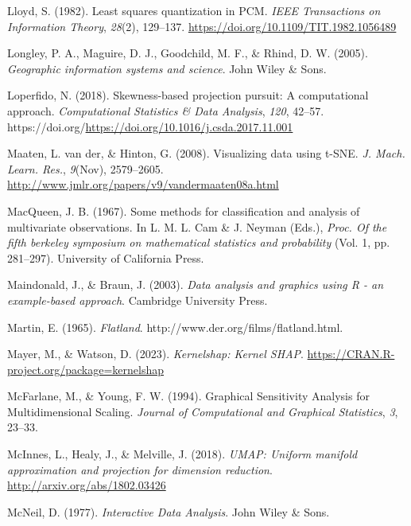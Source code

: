 \documentclass[
  letterpaper,
]{krantz}
\newlength{\cslhangindent}
\newenvironment{CSLReferences}[2] %
 {\begin{list}{}{%
  \setlength{\itemindent}{0pt}
  \setlength{\leftmargin}{0pt}
  \setlength{\parsep}{0pt}
  \ifodd #1
   \setlength{\leftmargin}{\cslhangindent}
   \setlength{\itemindent}{-1\cslhangindent}
  \fi
  \setlength{\itemsep}{#2\baselineskip}}}
 {\end{list}}
\begin{document}
\begin{CSLReferences}{1}{0}
Lloyd, S. (1982). Least squares quantization in PCM. \emph{IEEE
Transactions on Information Theory}, \emph{28}(2), 129--137.
\url{https://doi.org/10.1109/TIT.1982.1056489}

Longley, P. A., Maguire, D. J., Goodchild, M. F., \& Rhind, D. W.
(2005). \emph{Geographic information systems and science}. John Wiley \&
Sons.

Loperfido, N. (2018). Skewness-based projection pursuit: A computational
approach. \emph{Computational Statistics \& Data Analysis}, \emph{120},
42--57. https://doi.org/\url{https://doi.org/10.1016/j.csda.2017.11.001}

Maaten, L. van der, \& Hinton, G. (2008). Visualizing data using
{t-SNE}. \emph{J. Mach. Learn. Res.}, \emph{9}(Nov), 2579--2605.
\url{http://www.jmlr.org/papers/v9/vandermaaten08a.html}

MacQueen, J. B. (1967). Some methods for classification and analysis of
multivariate observations. In L. M. L. Cam \& J. Neyman (Eds.),
\emph{Proc. Of the fifth berkeley symposium on mathematical statistics
and probability} (Vol. 1, pp. 281--297). University of California Press.

Maindonald, J., \& Braun, J. (2003). \emph{Data analysis and graphics
using {R} - an example-based approach}. Cambridge University Press.

Martin, E. (1965). \emph{Flatland}.
http://www.der.org/films/flatland.html.

Mayer, M., \& Watson, D. (2023). \emph{Kernelshap: Kernel SHAP}.
\url{https://CRAN.R-project.org/package=kernelshap}

McFarlane, M., \& Young, F. W. (1994). Graphical {S}ensitivity
{A}nalysis for {M}ultidimensional {S}caling. \emph{Journal of
Computational and Graphical Statistics}, \emph{3}, 23--33.

McInnes, L., Healy, J., \& Melville, J. (2018). \emph{{UMAP}: Uniform
manifold approximation and projection for dimension reduction}.
\url{http://arxiv.org/abs/1802.03426}

McNeil, D. (1977). \emph{Interactive {D}ata {A}nalysis}. John Wiley \&
Sons.


\end{CSLReferences}
\end{document}
